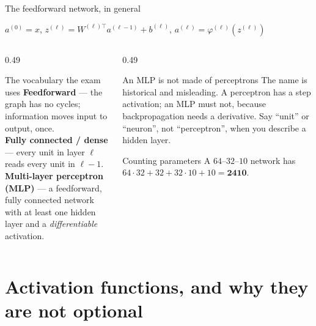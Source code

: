 \documentclass[aspectratio=169]{beamer}
\begin{document}
\begin{frame}[shrink=6]{The feedforward network, in general}
  \begin{exampleblock}{}
    \centering\large
    $a^{(0)} = x$, \qquad
    $z^{(\ell)} = W^{(\ell)\top} a^{(\ell-1)} + b^{(\ell)}$, \qquad
    $a^{(\ell)} = \varphi^{(\ell)}\!\left(z^{(\ell)}\right)$
  \end{exampleblock}
  \begin{columns}[T]
    \begin{column}{0.49\textwidth}
      \begin{block}{The vocabulary the exam uses}
        \textbf{Feedforward} --- the graph has no cycles; information moves
        input to output, once.\\[0.2em]
        \textbf{Fully connected / dense} --- every unit in layer $\ell$ reads
        every unit in $\ell-1$.\\[0.2em]
        \textbf{Multi-layer perceptron (MLP)} --- a feedforward, fully
        connected network with at least one hidden layer and a
        \emph{differentiable} activation.
      \end{block}
    \end{column}
    \begin{column}{0.49\textwidth}
      \begin{alertblock}{An MLP is not made of perceptrons}
        The name is historical and misleading. A perceptron has a step
        activation; an MLP must not, because backpropagation needs a
        derivative. Say ``unit'' or ``neuron'', not ``perceptron'', when you
        describe a hidden layer.
      \end{alertblock}
      \begin{block}{Counting parameters}
        A $64$--$32$--$10$ network has
        $64{\cdot}32 + 32 + 32{\cdot}10 + 10 = \mathbf{2410}$.
      \end{block}
    \end{column}
  \end{columns}
\end{frame}

\section[Activations]{Activation functions, and why they are not optional}
\label{sec:act}
\end{document}
